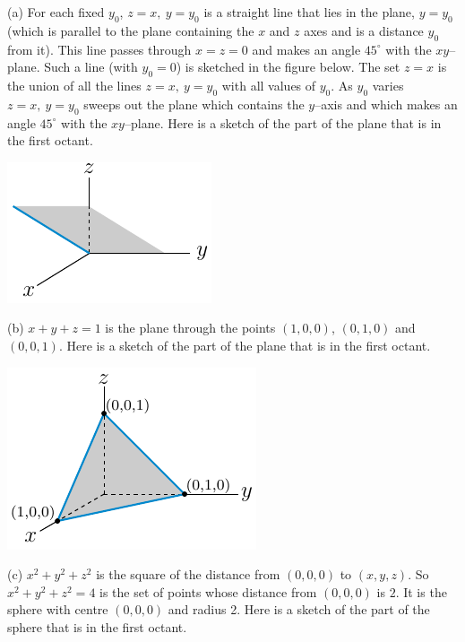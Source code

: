 \begin{solution}
(a) 
For each fixed $y_0$, $z=x,\ y=y_0$ is a straight line 
that lies in the plane, $y=y_0$ (which is parallel to the plane 
containing the $x$ and $z$ axes and is a distance $y_0$ from it). 
This line passes through $x=z=0$ and makes an angle $45^\circ$ 
with the $xy$--plane. Such a line (with $y_0=0$) is sketched in the 
figure below.
The set $z=x$ is the union of all the lines $z=x,\ y=y_0$ with all 
values of $y_0$. As $y_0$ varies  $z=x,\ y=y_0$ sweeps out the 
plane which contains the $y$--axis and which  makes an angle 
$45^\circ$ with the $xy$--plane. Here is a sketch of the part of the plane 
that is in the first octant.

\begin{center}
     \includegraphics{fig/xeqzPlane.pdf}
\end{center}


(b) 
$x+y+z=1$ is the plane through the points $(1,0,0)$, $(0,1,0)$
and  $(0,0,1)$. Here is a sketch of the part of the plane 
that is in the first octant.

\begin{center}
     \includegraphics{fig/xyzPlane.pdf}
\end{center}

(c)
  $x^2+y^2+z^2$ is the square of the distance from $(0,0,0)$ to $(x,y,z)$.
So $x^2+y^2+z^2=4$ is the set of points whose distance from $(0,0,0)$ is
$2$. It is the sphere with centre $(0,0,0)$ and radius 2.
Here is a sketch of the part of the sphere that is in the first octant.


\end{solution}
